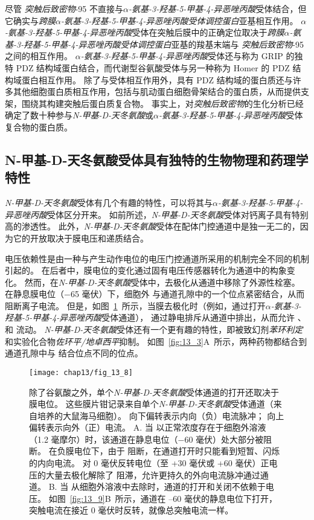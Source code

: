 尽管 \textit{突触后致密物}-95 不直接与\textit{$\alpha$-氨基-3-羟基-5-甲基-4-异恶唑丙酸}受体结合，但它确实与\textit{跨膜$\alpha$-氨基-3-羟基-5-甲基-4-异恶唑丙酸受体调控蛋白}亚基相互作用。
\textit{$\alpha$-氨基-3-羟基-5-甲基-4-异恶唑丙酸}受体在突触后膜中的正确定位取决于\textit{跨膜$\alpha$-氨基-3-羟基-5-甲基-4-异恶唑丙酸受体调控蛋白}亚基的羧基末端与 \textit{突触后致密物}-95 之间的相互作用。
\textit{$\alpha$-氨基-3-羟基-5-甲基-4-异恶唑丙酸}受体还与称为 GRIP 的独特 PDZ 结构域蛋白结合，而代谢型谷氨酸受体与另一种称为 Homer 的 PDZ 结构域蛋白相互作用。
除了与受体相互作用外，具有 PDZ 结构域的蛋白质还与许多其他细胞蛋白质相互作用，包括与肌动蛋白细胞骨架结合的蛋白质，从而提供支架，围绕其构建突触后蛋白质复合物。
事实上，对\textit{突触后致密物}的生化分析已经确定了数十种参与\textit{N-甲基-D-天冬氨酸}或\textit{$\alpha$-氨基-3-羟基-5-甲基-4-异恶唑丙酸}受体复合物的蛋白质。



\subsection{N-甲基-D-天冬氨酸受体具有独特的生物物理和药理学特性}

\textit{N-甲基-D-天冬氨酸}受体有几个有趣的特性，可以将其与\textit{$\alpha$-氨基-3-羟基-5-甲基-4-异恶唑丙酸}受体区分开来。
如前所述，\textit{N-甲基-D-天冬氨酸}受体对钙离子具有特别高的渗透性。
此外，\textit{N-甲基-D-天冬氨酸}受体在配体门控通道中是独一无二的，因为它的开放取决于膜电压和递质结合。


电压依赖性是由一种与产生动作电位的电压门控通道所采用的机制完全不同的机制引起的。
在后者中，膜电位的变化通过固有电压传感器转化为通道中的构象变化。
然而，在\textit{N-甲基-D-天冬氨酸}受体中，去极化从通道中移除了外源性栓塞。
在静息膜电位（−65 毫伏）下，细胞外  与通道孔隙中的一个位点紧密结合，从而阻断离子电流。
但是，如图~\ref{fig:13_8}~所示，当膜去极化时（例如，通过打开\textit{$\alpha$-氨基-3-羟基-5-甲基-4-异恶唑丙酸}受体通道）， 通过静电排斥从通道中排出，从而允许 、 和  流动。 
\textit{N-甲基-D-天冬氨酸}受体还有一个更有趣的特性，即被致幻剂\textit{苯环利定}和实验化合物\textit{佐环平/地卓西平}抑制。
如图~\ref{fig:13_3}A~所示，两种药物都结合到通道孔隙中与  结合位点不同的位点。


\begin{figure}[htbp]
	\centering
	\texttt{[image: chap13/fig\_13\_8]}
	\caption{除了谷氨酸之外，单个\textit{N-甲基-D-天冬氨酸}受体通道的打开还取决于膜电位。
		这些膜片钳记录来自单个\textit{N-甲基-D-天冬氨酸}受体通道（来自培养的大鼠海马细胞）。
		向下偏转表示内向（负）电流脉冲；
		向上偏转表示向外（正）电流。
		A. 当  以正常浓度存在于细胞外溶液（1.2 毫摩尔）时，该通道在静息电位（−60 毫伏）处大部分被阻断。
		在负膜电位下，由于  阻断，在通道打开时只能看到短暂、闪烁的内向电流。
		对 0 毫伏反转电位（至 +30 毫伏或 +60 毫伏）正电压的大量去极化解除了  阻滞，允许更持久的外向电流脉冲通过通道。
		B. 当  从细胞外溶液中去除时，通道的打开和关闭不依赖于电压。
		如图~\ref{fig:13_9}B~所示，通道在 –60 毫伏的静息电位下打开，突触电流在接近 0 毫伏时反转，就像总突触电流一样。}
	\label{fig:13_8}
\end{figure}


